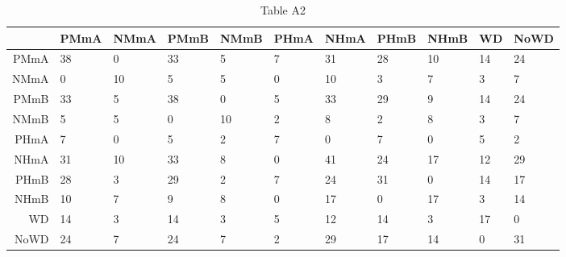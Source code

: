 \begin{table}[ht]
\centering
\begin{tabular}{rllllllllll}
  \hline
 & PMmA & NMmA & PMmB & NMmB & PHmA & NHmA & PHmB & NHmB & WD & NoWD \\ 
  \hline
PMmA & 38 &  0 & 33 &  5 &  7 & 31 & 28 & 10 & 14 & 24 \\ 
  NMmA &  0 & 10 &  5 &  5 &  0 & 10 &  3 &  7 &  3 &  7 \\ 
  PMmB & 33 &  5 & 38 &  0 &  5 & 33 & 29 &  9 & 14 & 24 \\ 
  NMmB &  5 &  5 &  0 & 10 &  2 &  8 &  2 &  8 &  3 &  7 \\ 
  PHmA &  7 &  0 &  5 &  2 &  7 &  0 &  7 &  0 &  5 &  2 \\ 
  NHmA & 31 & 10 & 33 &  8 &  0 & 41 & 24 & 17 & 12 & 29 \\ 
  PHmB & 28 &  3 & 29 &  2 &  7 & 24 & 31 &  0 & 14 & 17 \\ 
  NHmB & 10 &  7 &  9 &  8 &  0 & 17 &  0 & 17 &  3 & 14 \\ 
  WD & 14 &  3 & 14 &  3 &  5 & 12 & 14 &  3 & 17 &  0 \\ 
  NoWD & 24 &  7 & 24 &  7 &  2 & 29 & 17 & 14 &  0 & 31 \\ 
   \hline
\end{tabular}
\caption{Table A2} 
\end{table}
